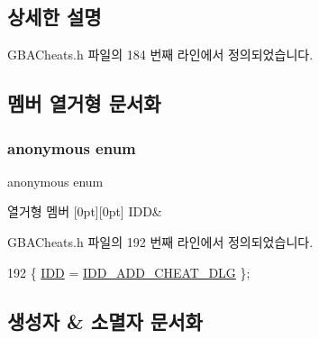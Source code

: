 \subsection{상세한 설명}


G\+B\+A\+Cheats.\+h 파일의 184 번째 라인에서 정의되었습니다.



\subsection{멤버 열거형 문서화}
\mbox{\label{class_add_g_s_a_code_ae09fbbcc1c447c677bf62ee2bcf7c945}} 
\subsubsection{\texorpdfstring{anonymous enum}{anonymous enum}}
{\footnotesize\ttfamily anonymous enum}

\begin{DoxyEnumFields}{열거형 멤버}
[0pt][0pt]{}\mbox{\label{class_add_g_s_a_code_ae09fbbcc1c447c677bf62ee2bcf7c945ade7716d104ed702a0c8cb0e4b61f64f4}} 
I\+DD&\\
\hline

\end{DoxyEnumFields}


G\+B\+A\+Cheats.\+h 파일의 192 번째 라인에서 정의되었습니다.


\begin{DoxyCode}
192 \{ \mbox{\hyperlink{class_add_g_s_a_code_ae09fbbcc1c447c677bf62ee2bcf7c945ade7716d104ed702a0c8cb0e4b61f64f4}{IDD}} = \mbox{\hyperlink{resource_8h_a388a8d7b6dea32798ece69044a21790d}{IDD\_ADD\_CHEAT\_DLG}} \};
\end{DoxyCode}


\subsection{생성자 \& 소멸자 문서화}
\mbox{\label{class_add_g_s_a_code_adae37d67fa94fcd376ae11c6d9bd9d01}} 
